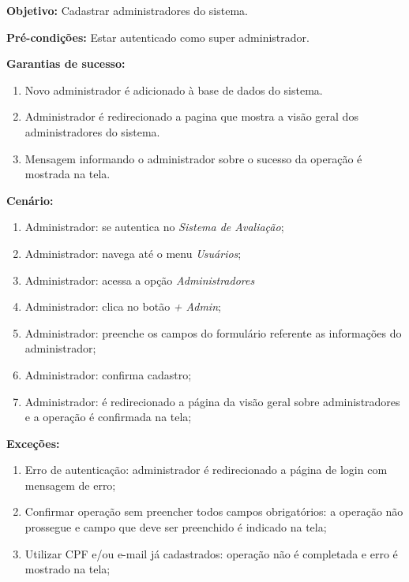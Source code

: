 \documentclass[
  12pt,       %
  openright,      %
  oneside,      %
  a4paper,      %
  english,      %
  french,        %
  spanish,     %
  brazil        %
  ]{abntex2-decsi}
\begin{document}
\begin{apendicesenv}
    \textbf{Objetivo:} Cadastrar administradores do sistema.
    
	\textbf{Pré-condições:} Estar autenticado como super administrador.
		
	\textbf{Garantias de sucesso:} 
        
            \begin{enumerate}
            
            \item Novo administrador é adicionado à base de dados do sistema.  
            \item Administrador é redirecionado a pagina que mostra a visão geral dos administradores do sistema.
            \item Mensagem informando o administrador sobre o sucesso da operação é mostrada na tela.
            
            \end{enumerate}
        
		\textbf{Cenário:}
		
		\begin{enumerate}
			\item Administrador: se autentica no \textit{Sistema de Avaliação};		
			\item Administrador: navega até o menu \textit{Usuários};	
			\item Administrador: acessa a opção \textit{Administradores}		
			\item Administrador: clica no botão \textit{+ Admin};
			\item Administrador: preenche os campos do formulário referente as informações do administrador;
            \item Administrador: confirma cadastro;
            \item Administrador: é redirecionado a página da visão geral sobre administradores e a operação é confirmada na tela;
		\end{enumerate}
		
		\textbf{Exceções:}
		
			\begin{enumerate}	
				\item Erro de autenticação: administrador é redirecionado a página de login com mensagem de erro;
				\item Confirmar operação sem preencher todos campos obrigatórios: a operação não prossegue e campo que deve ser preenchido é indicado na tela;
                \item Utilizar CPF e/ou e-mail já cadastrados: operação não é completada e erro é mostrado na tela;
			\end{enumerate}
    

\end{apendicesenv}
\end{document}

